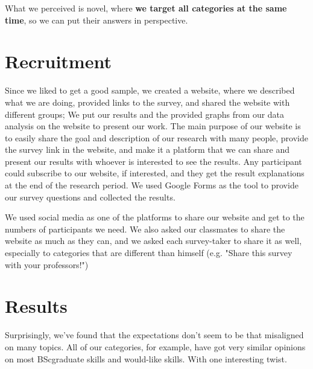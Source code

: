 \documentclass{sigchi}
\begin{document}
 What we perceived is novel, where \textbf{we target all categories at the same time}, so we can put their answers in perspective.
  
\section{Recruitment}
Since we liked to get a good sample, we created a website, where we described what we are doing, provided links to the survey, and shared the website with different groups; We put our results and the provided graphs from our data analysis on the website to present our work. The main purpose of our website is to easily share the goal and description of our research with many people, provide the survey link in the website, and make it a platform that we can share and present our results with whoever is interested to see the results. Any participant could subscribe to our website, if interested, and they get the result explanations at the end of the research period. We used Google Forms as the tool to provide our survey questions and collected the results.  

 We used social media as one of the platforms to share our website and get to the numbers of participants we need. We also asked our classmates to share the website as much as they can, and we asked each survey-taker to share it as well, especially to categories that are different than himself (e.g. "Share this survey with your professors!")
  
\section{Results}
Surprisingly, we've found that the expectations don't seem to be that misaligned on many topics. All of our categories, for example, have got very similar opinions on most BScgraduate skills and would-like skills. With one interesting twist.\newline
\end{document}
